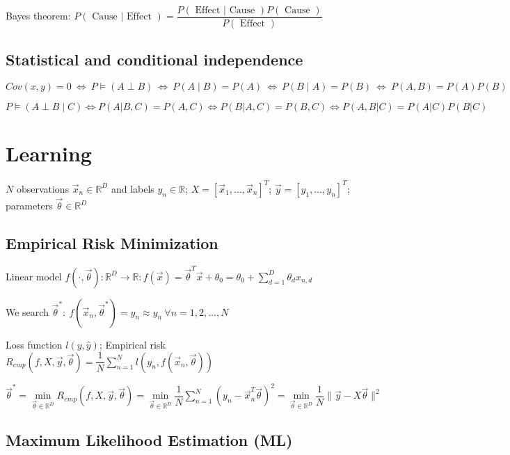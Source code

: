 \documentclass[]{article}
\begin{document}
	Bayes theorem: $P(\text { Cause } | \text { Effect })=\dfrac{P(\text { Effect } | \text { Cause }) P( \text{ Cause })}{P(\text { Effect })}$
	
	\subsection{Statistical and conditional independence}
	
	$Cov(x,y)=0 \ \Leftrightarrow \ P \models (A \perp B) \ \Leftrightarrow \ P(A \mid B)=P(A) \ \Leftrightarrow \ P(B \mid A)=P(B) \ \Leftrightarrow \ P(A,B)=P(A)P(B)$
	
	$P \models (A \perp B \mid C) \Leftrightarrow P(A|B,C) = P(A,C) \Leftrightarrow P(B|A,C) = P(B,C) \Leftrightarrow P(A,B|C) = P(A|C)P(B|C)$
	
	\section{Learning}
	
	$N$ observations $\vec{x}_n\in\mathbb{R}^D$ and labels $y_n\in\mathbb{R}$; $X=[\vec{x}_1,\dots,\vec{x}_n]^T$; $\vec{y}=[y_1,\dots,y_n]^T$; parameters $\vec{\theta}\in\mathbb{R}^{D}$
	
	\subsection{Empirical Risk Minimization}
	
	Linear model $f(\cdot,\vec{\theta}):\mathbb{R}^D\to\mathbb{R}:f(\vec{x})=\vec{\theta}^T \vec{x} + \theta_0 = \theta_0 + \sum\limits_{d=1}^D \theta_d x_{n,d}$
	
	We search $\vec{\theta}^* : \ f(\vec{x}_n, \vec{\theta}^*) = \hat{y}_n \approx y_n \ \forall n=1,2,\dots,N$
	
	Loss function $l(y, \hat{y})$; Empirical risk $R_{emp}(f,X,\vec{y},\vec{\theta})=\dfrac{1}{N}\sum\limits_{n=1}^N l(y_n,f(\vec{x}_n,\vec{\theta}))$
	
	$\vec{\theta}^* = \min\limits_{\vec{\theta} \in \mathbb{R}^D} R_{emp}(f,X,\vec{y},\vec{\theta}) = \min\limits_{\vec{\theta} \in \mathbb{R}^D} \dfrac{1}{N} \sum\limits_{n=1}^N (y_n - \vec{x}_n^T\vec{\theta})^2 = \min\limits_{\vec{\theta} \in \mathbb{R}^D} \dfrac{1}{N} \lVert \vec{y} - X \vec{\theta} \rVert^2$
	
	\subsection{Maximum Likelihood Estimation (ML)}
	
\end{document}
